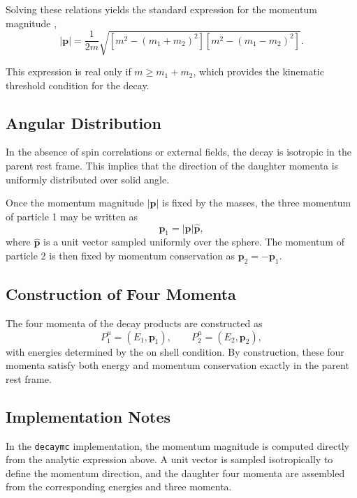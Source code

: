 \documentclass[11pt,a4paper]{article}
\newcommand{\p}{\mathbf{p}}
\begin{document}
Solving these relations yields the standard expression for the momentum magnitude \cite{griffiths_qm},
\begin{equation}
|\p| =
\frac{1}{2m}
\sqrt{\left[m^2 - (m_1 + m_2)^2\right]
      \left[m^2 - (m_1 - m_2)^2\right]} .
\end{equation}

This expression is real only if $m \ge m_1 + m_2$, which provides the kinematic
threshold condition for the decay.

\subsection{Angular Distribution}

In the absence of spin correlations or external fields, the decay is isotropic
in the parent rest frame. This implies that the direction of the daughter momenta
is uniformly distributed over solid angle.

Once the momentum magnitude $|\p|$ is fixed by the masses, the three momentum of
particle 1 may be written as
\begin{equation}
\p_1 = |\p| \hat{\p},
\end{equation}
where $\hat{\p}$ is a unit vector sampled uniformly over the sphere. The momentum
of particle 2 is then fixed by momentum conservation as $\p_2 = -\p_1$.

\subsection{Construction of Four Momenta}

The four momenta of the decay products are constructed as
\begin{equation}
P_1^\mu = (E_1, \p_1), \qquad
P_2^\mu = (E_2, \p_2),
\end{equation}
with energies determined by the on shell condition. By construction, these four
momenta satisfy both energy and momentum conservation exactly in the parent rest
frame.

\subsection{Implementation Notes}

In the \texttt{decaymc} implementation, the momentum magnitude is computed directly
from the analytic expression above. A unit vector is sampled isotropically to
define the momentum direction, and the daughter four momenta are assembled from
the corresponding energies and three momenta.
\end{document}
